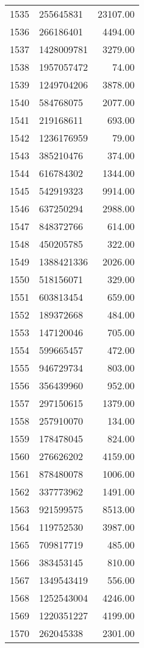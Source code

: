 \begin{table}[ht]
\begin{tabular}{rlr}
  1535 & 255645831 & 23107.00 \\ 
  1536 & 266186401 & 4494.00 \\ 
  1537 & 1428009781 & 3279.00 \\ 
  1538 & 1957057472 & 74.00 \\ 
  1539 & 1249704206 & 3878.00 \\ 
  1540 & 584768075 & 2077.00 \\ 
  1541 & 219168611 & 693.00 \\ 
  1542 & 1236176959 & 79.00 \\ 
  1543 & 385210476 & 374.00 \\ 
  1544 & 616784302 & 1344.00 \\ 
  1545 & 542919323 & 9914.00 \\ 
  1546 & 637250294 & 2988.00 \\ 
  1547 & 848372766 & 614.00 \\ 
  1548 & 450205785 & 322.00 \\ 
  1549 & 1388421336 & 2026.00 \\ 
  1550 & 518156071 & 329.00 \\ 
  1551 & 603813454 & 659.00 \\ 
  1552 & 189372668 & 484.00 \\ 
  1553 & 147120046 & 705.00 \\ 
  1554 & 599665457 & 472.00 \\ 
  1555 & 946729734 & 803.00 \\ 
  1556 & 356439960 & 952.00 \\ 
  1557 & 297150615 & 1379.00 \\ 
  1558 & 257910070 & 134.00 \\ 
  1559 & 178478045 & 824.00 \\ 
  1560 & 276626202 & 4159.00 \\ 
  1561 & 878480078 & 1006.00 \\ 
  1562 & 337773962 & 1491.00 \\ 
  1563 & 921599575 & 8513.00 \\ 
  1564 & 119752530 & 3987.00 \\ 
  1565 & 709817719 & 485.00 \\ 
  1566 & 383453145 & 810.00 \\ 
  1567 & 1349543419 & 556.00 \\ 
  1568 & 1252543004 & 4246.00 \\ 
  1569 & 1220351227 & 4199.00 \\ 
  1570 & 262045338 & 2301.00 \\ 

\end{tabular}
\end{table}
